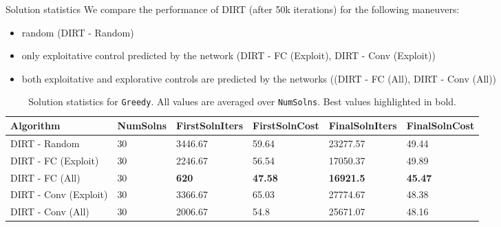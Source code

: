 \begin{columns}[t]
	\begin{column}{0.68\textwidth}
	\vspace{-1in}
		\begin{block}{\large Solution statistics}
		We compare the performance of DIRT (after 50k iterations) for the following maneuvers: 
		\begin{itemize}
			\item random (DIRT - Random) 
			\item only exploitative control predicted by the network (DIRT - FC (Exploit), DIRT - Conv (Exploit))
			\item both exploitative and explorative controls are predicted by the networks ((DIRT - FC (All), DIRT - Conv (All))
		\end{itemize} 
			\vspace{0.1in}
			\begin{table}[]
				\centering
				\begin{tabular}{|l|l|l|l|l|l|}
				\hline
				\textbf{Algorithm}    & \textbf{NumSolns} & \textbf{FirstSolnIters} & \textbf{FirstSolnCost} & \textbf{FinalSolnIters} & \textbf{FinalSolnCost} \\ [0.5ex]  \hline
				DIRT - Random         & 30                    & 3446.67                 & 59.64                     & 23277.57                & 49.44                     \\ \hline
				DIRT - FC (Exploit)   & 30                    & 2246.67                 & 56.54                     & 17050.37                & 49.89                     \\ \hline
				DIRT - FC (All)       & 30                    & \textbf{620}                     & \textbf{47.58}                     & \textbf{16921.5}                 & \textbf{45.47}                     \\ \hline
				DIRT - Conv (Exploit) & 30                    & 3366.67                 & 65.03                     & 27774.67                & 48.38                     \\ \hline
				DIRT - Conv (All)     & 30                    & 2006.67                 & 54.8                      & 25671.07                & 48.16                     \\   \hline
				\end{tabular}
				\vspace{.1in}
				\caption{Solution statistics for \texttt{Greedy}. All values are averaged over \texttt{NumSolns}. Best values highlighted in bold.
}
\end{table}
\end{block}
\end{column}
\end{columns}
